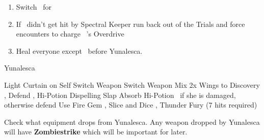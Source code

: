 \begin{enumerate}[resume]
	\item Switch \auron\ for \tidus
	\item If \lulu\ didn't get hit by Spectral Keeper run back out of the Trials and force encounters to charge \lulu\ 's Overdrive
	\item Heal everyone except \rikku\ before Yunalesca. 
\end{enumerate}
\begin{battle}[132000]{Yunalesca}
	\begin{itemize}
		\rikkuf Light Curtain on Self
		\tidusf Switch Weapon
		\luluf Switch Weapon
		\rikkuf Mix 2x Wings to Discovery
		\switch{\tidus}{\wakka}, Defend
		\switch{\lulu}{\auron}, Hi-Potion \rikku
		\enemyf Dispelling Slap
		\enemyf Absorb
		\wakkaf Hi-Potion \rikku\ if she is damaged, otherwise defend
		\rikkuf Use Fire Gem
		\switch{\auron}{\tidus}, Slice and Dice
		, Thunder Fury (7 hits required)
	\end{itemize}
\vspace{\baselineskip}
Check what equipment drops from Yunalesca. Any weapon dropped by Yunalesca will have \textbf{Zombiestrike} which will be important for later.
\end{battle}
